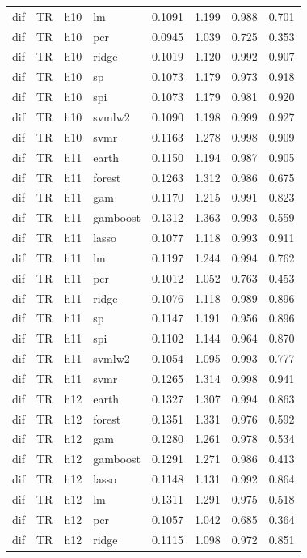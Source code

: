 \begin{ThreePartTable}
\begin{longtable}[t]{llclcccc}
dif & TR & h10 & lm & 0.1091 & 1.199 & 0.988 & 0.701\\
dif & TR & h10 & pcr & 0.0945 & 1.039 & 0.725 & 0.353\\
dif & TR & h10 & ridge & 0.1019 & 1.120 & 0.992 & 0.907\\
dif & TR & h10 & sp & 0.1073 & 1.179 & 0.973 & 0.918\\
dif & TR & h10 & spi & 0.1073 & 1.179 & 0.981 & 0.920\\
dif & TR & h10 & svmlw2 & 0.1090 & 1.198 & 0.999 & 0.927\\
dif & TR & h10 & svmr & 0.1163 & 1.278 & 0.998 & 0.909\\
\addlinespace
dif & TR & h11 & earth & 0.1150 & 1.194 & 0.987 & 0.905\\
dif & TR & h11 & forest & 0.1263 & 1.312 & 0.986 & 0.675\\
dif & TR & h11 & gam & 0.1170 & 1.215 & 0.991 & 0.823\\
dif & TR & h11 & gamboost & 0.1312 & 1.363 & 0.993 & 0.559\\
dif & TR & h11 & lasso & 0.1077 & 1.118 & 0.993 & 0.911\\
dif & TR & h11 & lm & 0.1197 & 1.244 & 0.994 & 0.762\\
dif & TR & h11 & pcr & 0.1012 & 1.052 & 0.763 & 0.453\\
dif & TR & h11 & ridge & 0.1076 & 1.118 & 0.989 & 0.896\\
dif & TR & h11 & sp & 0.1147 & 1.191 & 0.956 & 0.896\\
dif & TR & h11 & spi & 0.1102 & 1.144 & 0.964 & 0.870\\
dif & TR & h11 & svmlw2 & 0.1054 & 1.095 & 0.993 & 0.777\\
dif & TR & h11 & svmr & 0.1265 & 1.314 & 0.998 & 0.941\\
\addlinespace
dif & TR & h12 & earth & 0.1327 & 1.307 & 0.994 & 0.863\\
dif & TR & h12 & forest & 0.1351 & 1.331 & 0.976 & 0.592\\
dif & TR & h12 & gam & 0.1280 & 1.261 & 0.978 & 0.534\\
dif & TR & h12 & gamboost & 0.1291 & 1.271 & 0.986 & 0.413\\
dif & TR & h12 & lasso & 0.1148 & 1.131 & 0.992 & 0.864\\
dif & TR & h12 & lm & 0.1311 & 1.291 & 0.975 & 0.518\\
dif & TR & h12 & pcr & 0.1057 & 1.042 & 0.685 & 0.364\\
dif & TR & h12 & ridge & 0.1115 & 1.098 & 0.972 & 0.851\\

\end{longtable}
\end{ThreePartTable}
